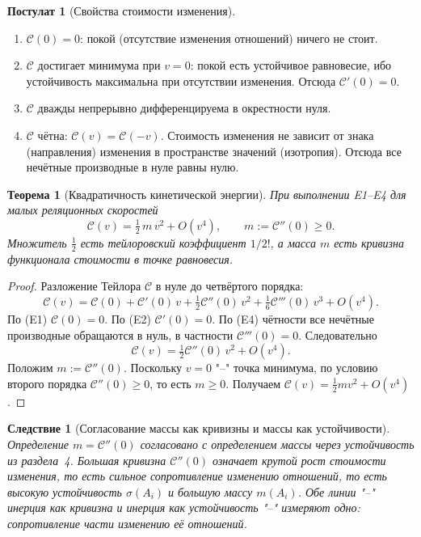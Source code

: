 \documentclass[12pt,a4paper]{article}
\theoremstyle{definition}
\newtheorem{postulate}{Постулат}[section]
\theoremstyle{plain}
\newtheorem{theorem}{Теорема}[section]
\newtheorem{corollary}{Следствие}[section]
\theoremstyle{remark}
\newcommand{\Stab}{\sigma}
\newcommand{\Cost}{\mathcal C}
\begin{document}
\begin{postulate}[Свойства стоимости изменения]\label{post:cost}
\begin{enumerate}
    \item[(E1)] $\Cost(0)=0$: покой (отсутствие изменения отношений) ничего не стоит.
    \item[(E2)] $\Cost$ достигает минимума при $v=0$: покой есть устойчивое
    равновесие, ибо устойчивость максимальна при отсутствии изменения. Отсюда
    $\Cost'(0)=0$.
    \item[(E3)] $\Cost$ дважды непрерывно дифференцируема в окрестности нуля.
    \item[(E4)] $\Cost$ чётна: $\Cost(v)=\Cost(-v)$. Стоимость изменения не зависит
    от знака (направления) изменения в пространстве значений (изотропия). Отсюда все
    нечётные производные в нуле равны нулю.
\end{enumerate}
\end{postulate}

\begin{theorem}[Квадратичность кинетической энергии]\label{thm:kinetic}
При выполнении E1--E4 для малых реляционных скоростей
\[
\Cost(v)=\tfrac12\,m\,v^2+O(v^4),\qquad m:=\Cost''(0)\ge0.
\]
Множитель $\tfrac12$ есть тейлоровский коэффициент $1/2!$, а масса $m$ есть кривизна
функционала стоимости в точке равновесия.
\end{theorem}

\begin{proof}
Разложение Тейлора $\Cost$ в нуле до четвёртого порядка:
\[
\Cost(v)=\Cost(0)+\Cost'(0)\,v+\tfrac12\Cost''(0)\,v^2+\tfrac16\Cost'''(0)\,v^3+O(v^4).
\]
По (E1) $\Cost(0)=0$. По (E2) $\Cost'(0)=0$. По (E4) чётности все нечётные
производные обращаются в нуль, в частности $\Cost'''(0)=0$. Следовательно
\[
\Cost(v)=\tfrac12\Cost''(0)\,v^2+O(v^4).
\]
Положим $m:=\Cost''(0)$. Поскольку $v=0$ "--" точка минимума, по условию второго
порядка $\Cost''(0)\ge0$, то есть $m\ge0$. Получаем $\Cost(v)=\tfrac12 m v^2+O(v^4)$.
\end{proof}

\begin{corollary}[Согласование массы как кривизны и массы как устойчивости]
Определение $m=\Cost''(0)$ согласовано с определением массы через устойчивость из
раздела~4. Большая кривизна $\Cost''(0)$ означает крутой рост стоимости изменения,
то есть сильное сопротивление изменению отношений, то есть высокую устойчивость
$\Stab(A_i)$ и большую массу $m(A_i)$. Обе линии "--" инерция как кривизна и инерция
как устойчивость "--" измеряют одно: сопротивление части изменению её отношений.
\end{corollary}
\end{document}
